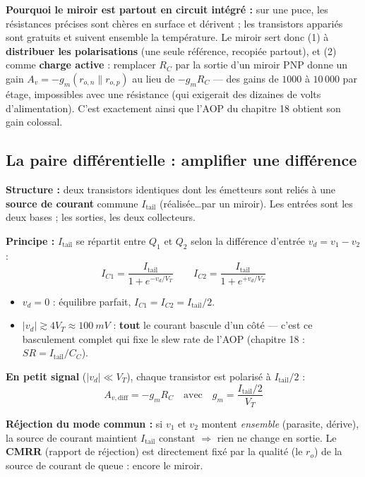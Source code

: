 \documentclass[12pt,a4paper,twoside]{book}
\begin{document}
\begin{intuition}
\textbf{Pourquoi le miroir est partout en circuit intégré :} sur une puce, les résistances précises sont chères en surface et dérivent ; les transistors appariés sont gratuits et suivent ensemble la température. Le miroir sert donc (1) à \textbf{distribuer les polarisations} (une seule référence, recopiée partout), et (2) comme \textbf{charge active} : remplacer $R_C$ par la sortie d'un miroir PNP donne un gain $A_v = -g_m(r_{o,n} \parallel r_{o,p})$ au lieu de $-g_m R_C$ --- des gains de $1000$ à $10\,000$ par étage, impossibles avec une résistance (qui exigerait des dizaines de volts d'alimentation). C'est exactement ainsi que l'AOP du chapitre 18 obtient son gain colossal.
\end{intuition}

\subsection{La paire différentielle : amplifier une différence}

\begin{formule}
\textbf{Structure :} deux transistors identiques dont les émetteurs sont reliés à une \textbf{source de courant} commune $I_{\text{tail}}$ (réalisée\ldots par un miroir). Les entrées sont les deux bases ; les sorties, les deux collecteurs.

\textbf{Principe :} $I_{\text{tail}}$ se répartit entre $Q_1$ et $Q_2$ selon la différence d'entrée $v_d = v_1 - v_2$ :
\[
I_{C1} = \frac{I_{\text{tail}}}{1 + e^{-v_d/V_T}} \qquad I_{C2} = \frac{I_{\text{tail}}}{1 + e^{+v_d/V_T}}
\]
\begin{itemize}[nosep]
\item $v_d = 0$ : équilibre parfait, $I_{C1} = I_{C2} = I_{\text{tail}}/2$.
\item $|v_d| \gtrsim 4V_T \approx \SI{100}{mV}$ : \textbf{tout} le courant bascule d'un côté --- c'est ce basculement complet qui fixe le slew rate de l'AOP (chapitre 18 : $SR = I_{\text{tail}}/C_C$).
\end{itemize}

\textbf{En petit signal} ($|v_d| \ll V_T$), chaque transistor est polarisé à $I_{\text{tail}}/2$ :
\[
\boxed{A_{v,\text{diff}} = -g_m R_C \quad \text{avec} \quad g_m = \frac{I_{\text{tail}}/2}{V_T}}
\]

\textbf{Réjection du mode commun :} si $v_1$ et $v_2$ montent \textit{ensemble} (parasite, dérive), la source de courant maintient $I_{\text{tail}}$ constant $\Rightarrow$ rien ne change en sortie. Le \textbf{CMRR} (rapport de réjection) est directement fixé par la qualité (le $r_o$) de la source de courant de queue : encore le miroir.
\end{formule}
\end{document}
